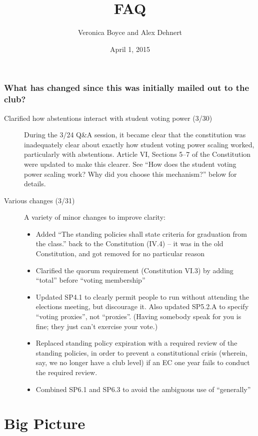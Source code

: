 \documentclass{article}
\title{FAQ}
\author{Veronica Boyce and Alex Dehnert}
\date{April 1, 2015}
\begin{document}
\maketitle

\subsubsection*{What has changed since this was initially mailed out to the club?}
\begin{description}
\item[Clarified how abstentions interact with student voting power (3/30)] During the 3/24 Q\&A session, it became clear that the constitution was inadequately clear about exactly how student voting power scaling worked, particularly with abstentions. Article VI, Sections 5--7 of the Constitution were updated to make this clearer. See ``How does the student voting power scaling work? Why did you choose this mechanism?'' below for details.
\item[Various changes (3/31)] A variety of minor changes to improve clarity:
  \begin{itemize}
  \item Added ``The standing policies shall state criteria for graduation from the class.'' back to the Constitution (IV.4) -- it was in the old Constitution, and got removed for no particular reason
  \item Clarified the quorum requirement (Constitution VI.3) by adding ``total'' before ``voting membership''
  \item Updated SP4.1 to clearly permit people to run without attending the elections meeting, but discourage it. Also updated SP5.2.A to specify ``voting proxies'', not ``proxies''. (Having somebody speak for you is fine; they just can't exercise your vote.)
  \item Replaced standing policy expiration with a required review of the standing policies, in order to prevent a constitutional crisis (wherein, say, we no longer have a club level) if an EC one year fails to conduct the required review.
  \item Combined SP6.1 and SP6.3 to avoid the ambiguous use of ``generally''
  \end{itemize}

\end{description}

\section{Big Picture}
\end{document}
